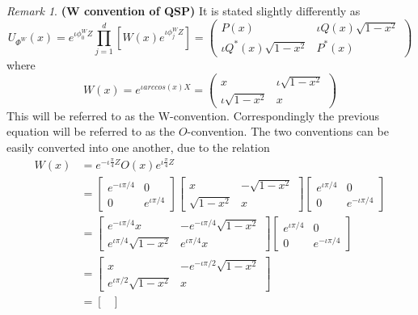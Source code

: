 \documentclass[12pt, oneside]{book}
\theoremstyle{definition}
\theoremstyle{definition}
\theoremstyle{remark}
\newtheorem*{remark}{Remark}
\begin{document}
\begin{remark}
    \textbf{(W convention of QSP)} It is stated slightly differently as
    \[
    U_{\Phi^W}(x)=e^{\iota \phi_0^WZ}\prod_{j=1}^d [W(x)e^{\iota \phi_j^WZ}] = \begin{pmatrix} P(x) & \iota Q(x)\sqrt{1-x^2} \\ \iota Q^*(x)\sqrt{1-x^2} & P^*(x) \end{pmatrix}
    \]
    where
    \[
    W(x)=e^{\iota arccos(x)X}=\begin{pmatrix} x & \iota \sqrt{1-x^2} \\ \iota \sqrt{1-x^2} & x \end{pmatrix}
    \]
    This will be referred to as the W-convention. Correspondingly the previous equation will be referred to as the $O$-convention. The two conventions can be easily converted into one another, due to the relation
    \begin{align*}
    W(x) &= e^{-\iota \frac{\pi}{4}Z} O(x)e^{\iota \frac{\pi}{4}Z}\\
    &=\begin{bmatrix}
        e^{-\iota \pi/4} & 0 \\
        0 & e^{\iota \pi/4}
    \end{bmatrix}\begin{bmatrix}
        x & -\sqrt{1-x^2}\\
        \sqrt{1-x^2} & x
    \end{bmatrix}\begin{bmatrix}
        e^{\iota \pi/4} & 0 \\
        0 & e^{-\iota \pi/4}
    \end{bmatrix}\\
    &=\begin{bmatrix}
        e^{-\iota \pi/4}x & -e^{-\iota \pi/4}\sqrt{1-x^2}\\
        e^{\iota \pi/4}\sqrt{1-x^2} &e^{\iota \pi/4} x
    \end{bmatrix}\begin{bmatrix}
        e^{\iota \pi/4} & 0 \\
        0 & e^{-\iota \pi/4}
    \end{bmatrix}\\
    &=\begin{bmatrix}
        x & -e^{-\iota \pi/2}\sqrt{1-x^2}\\
        e^{\iota \pi/2}\sqrt{1-x^2} & x
    \end{bmatrix}\\
    &=\begin{bmatrix}

\end{bmatrix}
\end{align*}
\end{remark}
\end{document}
